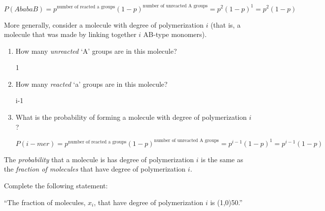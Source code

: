 \begin{activity}
\begin{ctqs}
\begin{enumerate}
				\begin{solution}[0.5in]
					$P(AbabaB) = p^\text{number of reacted a groups}(1-p)^\text{number of unreacted A groups} = p^2(1-p)^1 = p^2(1-p)$
				\end{solution}
				
		\end{enumerate}
		
	\question More generally, consider a molecule with degree of polymerization $i$ (that is, a molecule that was made by linking together $i$ AB-type monomers).
	
		\begin{enumerate}
		
			\item How many \emph{unreacted} `A' groups are in this molecule?
			
				\begin{solution}[0.5in]
					1
				\end{solution}
				
			\item How many \emph{reacted} `a' groups are in this molecule?
			
				\begin{solution}[0.5in]
					i-1
				\end{solution}
				
			\item What is the probability of forming a molecule with degree of polymerization $i$?
			
				\begin{solution}[1in]
					$P(i-mer) = p^\text{number of reacted a groups}(1-p)^\text{number of unreacted A groups} = p^{i-1}(1-p)^1 = p^{i-1}(1-p)$
				\end{solution}
			
		\end{enumerate}
		
\end{ctqs}

\begin{infobox}
	The \emph{probability} that a molecule is has degree of polymerization $i$ is the same as the \emph{fraction of molecules} that have degree of polymerization $i$.
\end{infobox}


\begin{ctqs}
	
	\question Complete the following statement:
	
		``The fraction of molecules, $x_i$, that have degree of polymerization $i$ is \line(1,0){50}.''
	

\end{ctqs}
\end{activity}
